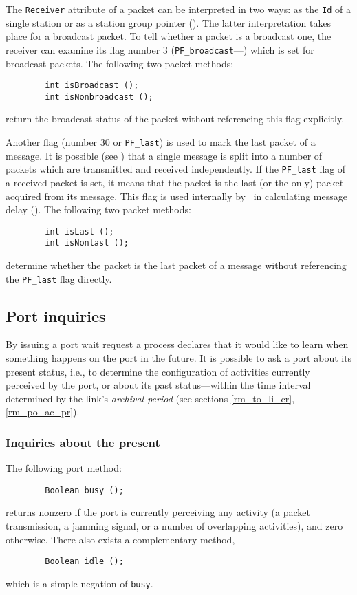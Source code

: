 The {\tt Receiver} attribute of a packet can be interpreted in two
ways: as the {\tt Id} of a single station or as a station group
pointer ().
The latter interpretation takes place for a broadcast packet.
To tell whether a packet is a broadcast one, the receiver
can examine its flag
number 3 ({\tt PF\_broadcast}---)
which is set for broadcast packets.
The following two packet methods:
\begin{verbatim}
        int isBroadcast ();
        int isNonbroadcast ();
\end{verbatim}
return the broadcast status of the packet without referencing
this flag explicitly.

Another flag (number 30 or {\tt PF\_last}) is used to mark the last packet
of a message.
It is possible (see ) that a single message is split into
a number of packets which are transmitted and received independently.
If the {\tt PF\_last} flag of a received packet is set, it means that the
packet is the last (or the only) packet acquired from its message.
This flag is used internally by \smurph\ in calculating message delay
().
The following two packet methods:
\begin{verbatim}
        int isLast ();
        int isNonlast ();
\end{verbatim}
determine whether the packet is the last packet of a message
without referencing the {\tt PF\_last} flag directly.

\subsection{Port inquiries}
\label{rm_po_in}

By issuing a port wait request a process declares that it would like to learn
when something happens on the port in the future.
It is possible to ask a port about its present status, i.e., to determine
the configuration of activities currently perceived by the port, or
about its past status---within the time interval determined by the
link's {\em archival period\/}
(see sections \ref{rm_to_li_cr}, \ref{rm_po_ac_pr}).

\subsubsection{Inquiries about the present}
\label{rm_po_in_pr}

The following port method:
\begin{verbatim}
        Boolean busy ();
\end{verbatim}
returns nonzero if the port is currently perceiving any activity (a packet
transmission, a jamming signal, or a number of overlapping activities), and
zero otherwise.
There also exists a complementary method,
\begin{verbatim}
        Boolean idle ();
\end{verbatim}
which is a simple negation of {\tt busy}.

